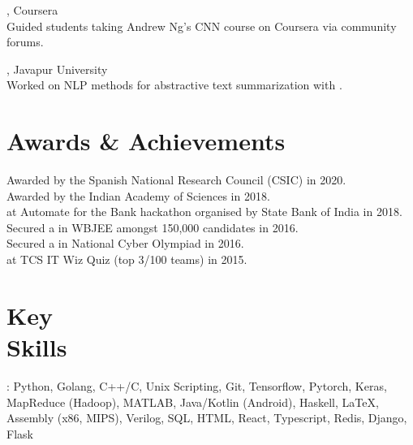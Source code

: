 \documentclass[mm]{simple_style}
\begin{document}
\begin{resume}
\vspace{-4.5ex}

, Coursera \\
Guided students taking Andrew Ng's CNN course on Coursera via community forums.\\

\vspace{-4.5ex}

, Javapur University \\
Worked on NLP methods for abstractive text summarization with .

\vspace{-2ex}
\sectionline


\section{Awards \& Achievements}
Awarded  by the Spanish National Research Council (CSIC) in 2020.\\
Awarded  by the Indian Academy of Sciences in 2018.\\
 at Automate for the Bank hackathon organised by State Bank of India in 2018.\\
Secured a  in WBJEE amongst 150,000 candidates in 2016.\\
Secured a  in National Cyber Olympiad in 2016.\\
 at TCS IT Wiz Quiz (top 3/100 teams) in 2015.

\vspace{-2ex}
\sectionline


\section{Key\\Skills}
: Python, Golang, C++/C, Unix Scripting, Git, Tensorflow, Pytorch, Keras, MapReduce (Hadoop), MATLAB, Java/Kotlin (Android), Haskell, \LaTeX, Assembly (x86, MIPS), Verilog, SQL, HTML, React, Typescript, Redis, Django, Flask
\\


\end{resume}
\end{document}
